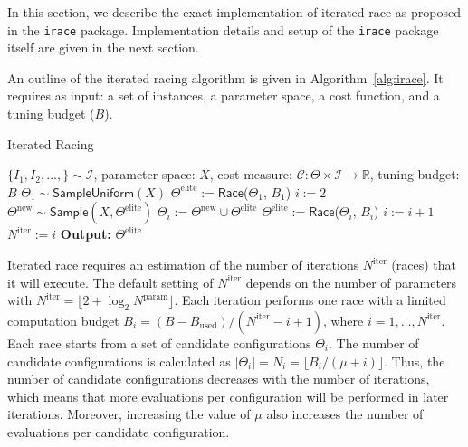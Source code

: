 \documentclass[a4paper]{article}
\newcommand{\irace}{\texttt{irace}\xspace}
\newcommand{\assign}{\ensuremath{:=}}
\newcommand{\procedure}[1]{\textsf{#1}}
\newcommand{\iter}{\ensuremath{i}\xspace}
\newcommand{\Budget}{\ensuremath{B}\xspace}
\newcommand{\Budgeti}{\ensuremath{\Budget_{\iter}}\xspace}
\newcommand{\Bused}{\ensuremath{\Budget_\text{used}}\xspace}
\newcommand{\Ncand}[1][]{\ensuremath{N_{#1}}\xspace}
\newcommand{\Nparam}{\ensuremath{{N^\text{param}}}\xspace}
\newcommand{\Niter}{\ensuremath{N^\text{iter}}\xspace}
\newcommand{\Nmin}{\ensuremath{N^\text{min}}\xspace}
\newcommand{\Nsurv}{\ensuremath{N^\text{surv}}\xspace}
\newcommand{\Celite}{\ensuremath{\Theta^\text{elite}}\xspace}
\begin{document}
In this section, we describe the exact implementation of iterated
race as proposed in the \irace package. Implementation details and setup of the \irace package itself are given in the next section.

An outline of the iterated racing algorithm is given in
Algorithm~\ref{alg:irace}. It requires as input: a set of instances, a
parameter space, a cost function, and a tuning budget ($\Budget$).

\begin{algorithm}[tb]
\caption{Iterated Racing}\label{alg:irace}
\begin{algorithmic}[1]
\REQUIRE $\{I_1,I_2,\dotsc,\} \sim\mathcal{I}$,\newline
parameter space: $X$,\newline
cost measure: $\mathcal{C}\colon \Theta
\times \mathcal{I} \to \mathbb{R}$,\newline
tuning budget: $\Budget$
\STATE $\Theta_1 \sim \procedure{SampleUniform}(X)$
\STATE $\Celite \assign \procedure{Race}$($\Theta_1$, $\Budget_1$)
  \STATE $i \assign 2$
\WHILE{$\Bused \leq \Budget$}
  \STATE $\Theta^\text{new} \sim \textsf{Sample}(X, \Celite)$
\STATE $\Theta_i \assign \Theta^\text{new} \cup \Celite$
\STATE $\Celite \assign \procedure{Race}$($\Theta_i$, $\Budgeti$)
\STATE $i \assign i + 1$
\IF{$i > \Niter$}
\STATE $\Niter \assign i$
\ENDIF
\ENDWHILE
\STATE \textbf{Output:} $\Celite$
\end{algorithmic}
\end{algorithm}


Iterated race requires an estimation of the number of iterations
$\Niter$ (races) that it will execute. The default setting of $\Niter$
depends on the number of parameters with $\Niter = \lfloor 2 +
\log_{2}\Nparam \rfloor$. Each iteration performs one race with a
limited computation budget $\Budgeti = (\Budget - \Bused) / (\Niter -
\iter + 1)$, where $\iter = 1, \dotsc, \Niter$. Each race starts from
a set of candidate configurations $\Theta_\iter$. The number of
candidate configurations is calculated as $|\Theta_\iter|= \Ncand[\iter] =
\lfloor \Budgeti / (\mu + \iter)\rfloor$. Thus, the number of
candidate configurations decreases with the number of iterations,
which means that more evaluations per configuration will be performed
in later iterations. Moreover, increasing the value of $\mu$ also
increases the number of evaluations per candidate configuration. 
\end{document}
